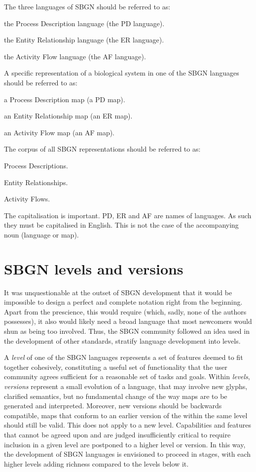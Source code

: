 The three languages of SBGN should be referred to as:
\begin{compactitem}
\item the Process Description language (the PD language).
\item the Entity Relationship language (the ER language).
\item the Activity Flow language  (the AF language).
\end{compactitem}
A specific representation of a biological system in one of the SBGN languages should be referred to as:
\begin{compactitem}
\item a Process Description map (a PD map).
\item an Entity Relationship map (an ER map).
\item an Activity Flow map (an AF map).
\end{compactitem}
The corpus of all SBGN representations should be referred to as:
\begin{compactitem}
\item Process Descriptions.
\item Entity Relationships.
\item Activity Flows.
\end{compactitem}
The capitalisation is important. PD, ER and AF are names of languages. 
As such they must be capitalised in English. This is not the case of the accompanying noun (language or map).

\section{SBGN levels and versions}
\label{sec:sbgn-levels}

It was unquestionable at the outset of SBGN development that it would be impossible 
to design a perfect and complete notation right from the beginning.  Apart 
from the prescience, this would require (which, sadly, none of the authors 
possesses), it also would likely need a broad language that most newcomers 
would shun as being too involved.  Thus, the SBGN community followed an idea 
used in the development of other standards, \ie stratify language 
development into levels.

A \emph{level} of one of the SBGN languages represents a set of features 
deemed to fit together cohesively, constituting a useful set of 
functionality that the user community agrees sufficient for a reasonable 
set of tasks and goals. Within \emph{levels}, \emph{versions} represent 
a small evolution of a language, that may involve new glyphs, clarified 
semantics, but no fundamental change of the way maps are to be generated 
and interpreted. Moreover, new versions should be backwards compatible, 
\ie \PD maps that conform to an earlier version of the \PDl within 
the same level should still be valid. This does not apply to a new level.
Capabilities and features that cannot be agreed upon and 
are judged insufficiently critical to require inclusion in a given level 
are postponed to a higher level or version.  In this way, the development 
of SBGN languages is envisioned to proceed in stages, with each higher 
levels adding richness compared to the levels below it.

